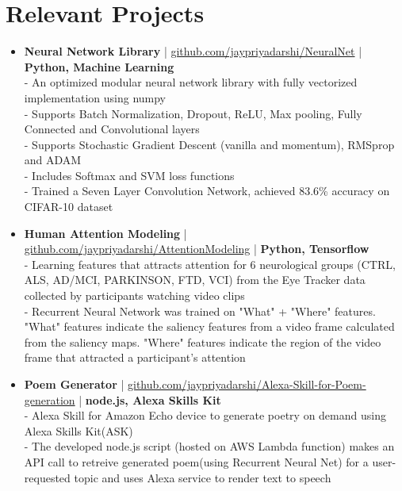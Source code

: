 \section{Relevant Projects}
\begin{itemize}
 \item \textbf{Neural Network Library} | \href{https://github.com/jaypriyadarshi/NeuralNet}{github.com/jaypriyadarshi/NeuralNet} | \textbf{Python, Machine Learning}\\
 - An optimized modular neural network library with fully vectorized implementation using numpy\\
 - Supports Batch Normalization, Dropout, ReLU, Max pooling, Fully Connected and Convolutional layers\\
 - Supports Stochastic Gradient Descent (vanilla and momentum), RMSprop and ADAM\\
 - Includes Softmax and SVM loss functions\\
 - Trained a Seven Layer Convolution Network, achieved 83.6\% accuracy on CIFAR-10 dataset 
\vspace{-1mm}
\item \textbf{Human Attention Modeling} | \href{https://github.com/jaypriyadarshi/AttentionModeling}{github.com/jaypriyadarshi/AttentionModeling} | \textbf{Python, Tensorflow}\\
 - Learning features that attracts attention for 6 neurological groups (CTRL, ALS, AD/MCI, PARKINSON, FTD, VCI) from the Eye Tracker data collected by participants watching video clips\\
 - Recurrent Neural Network was trained on "What" + "Where" features. "What" features indicate the saliency features from a video frame calculated from the saliency maps. "Where" features indicate the region of the video frame that attracted a participant's attention
\vspace{-1mm}
\item \textbf{Poem Generator} | \href{https://github.com/jaypriyadarshi/Alexa-Skill-for-Poem-generation}{github.com/jaypriyadarshi/Alexa-Skill-for-Poem-generation} | \textbf{node.js, Alexa Skills Kit}\\
 - Alexa Skill for Amazon Echo device to generate poetry on demand using Alexa Skills Kit(ASK)\\
 - The developed node.js script (hosted on AWS Lambda function) makes an API call to retreive generated poem(using Recurrent Neural Net) for a user-requested topic and uses Alexa service to render text to speech

\end{itemize}
\vspace{5pt}
